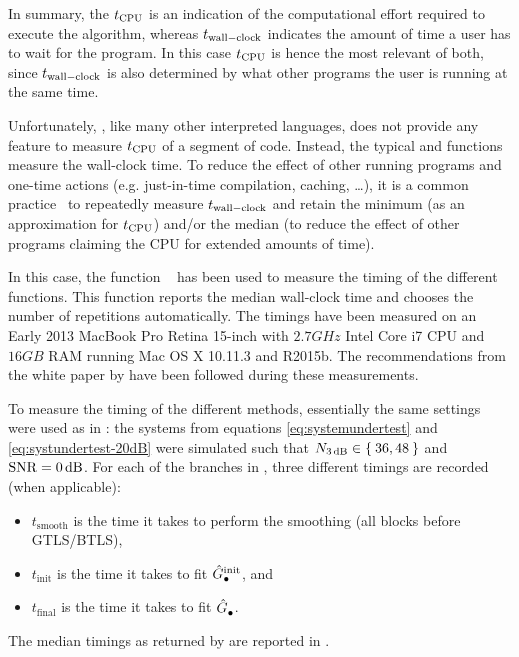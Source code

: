 In summary, the $\cputime$ is an indication of the computational effort required to execute the algorithm, whereas $\wallclocktime$ indicates the amount of time a user has to wait for the program.
In this case $\cputime$ is hence the most relevant of both, since $\wallclocktime$ is also determined by what other programs the user is running at the same time.

Unfortunately, \MATLAB, like many other interpreted languages, does not provide any feature to measure $\cputime$ of a segment of code.
Instead, the typical  and  functions measure the wall-clock time.
To reduce the effect of other running programs and one-time actions (e.g. just-in-time compilation, caching, \ldots), it is a common practice~\citep{McKeeman2008} to repeatedly measure $\wallclocktime$ and retain the minimum (as an approximation for $\cputime$) and/or the median (to reduce the effect of other programs claiming the \gls{CPU} for extended amounts of time).

In this case, the \MATLAB function ~\citep{matlab:timeit} has been used to measure the timing of the different functions.
This function  reports the median wall-clock time and chooses the number of repetitions automatically.
The timings have been measured on an Early 2013 MacBook Pro Retina 15-inch with $2.7\unit{GHz}$ Intel Core i7 \gls{CPU} and $16 \unit{GB}$ \gls{RAM} running Mac OS X 10.11.3 and \MATLAB R2015b.
The recommendations from the white paper by \citet{McKeeman2008} have been followed during these measurements.

To measure the timing of the different methods, essentially the same settings were used as in : the systems from equations \eqref{eq:systemundertest} and \eqref{eq:systundertest-20dB} were simulated such that $N_{3\unit{dB}} \in \Set{36,48}$ and $\SNR = 0 \unit{dB}$.
For each of the branches in , three different timings are recorded (when applicable):
\begin{itemize}
  \item $t_{\mathrm{smooth}}$ is the time it takes to perform the smoothing (all blocks before \gls{GTLS}/\gls{BTLS}),
  \item $t_{\mathrm{init}}$ is the time it takes to fit $\model[init]{\bullet}$, and
  \item $t_{\mathrm{final}}$ is the time it takes to fit $\model{\bullet}$.
\end{itemize}
The median timings as returned by  are reported in .

